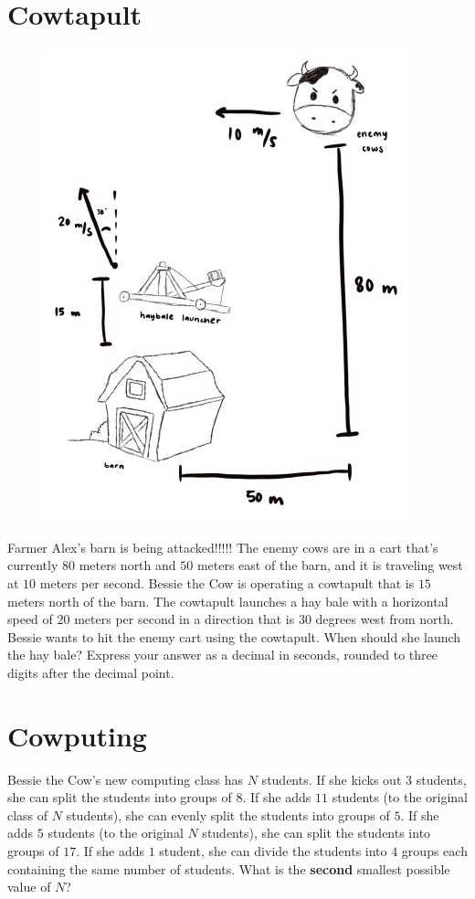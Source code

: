\documentclass{article}
\begin{document}
\section*{Cowtapult}
\begin{figure}
    \vspace{-20pt}
    \centering
    \includegraphics[scale=0.25]{cowtapult.png}
    \vspace{-20pt}
\end{figure}
Farmer Alex's barn is being attacked!!!!!
The enemy cows are in a cart that's currently $80$ meters north and $50$ meters east of the barn, and it is traveling west at $10$ meters per second.
Bessie the Cow is operating a cowtapult that is $15$ meters north of the barn.
The cowtapult launches a hay bale with a horizontal speed of $20$ meters per second in a direction that is $30$ degrees west from north.
Bessie wants to hit the enemy cart using the cowtapult.
When should she launch the hay bale?
Express your answer as a decimal in seconds, rounded to three digits after the decimal point.

\section*{Cowputing}
Bessie the Cow's new computing class has $N$ students.
If she kicks out $3$ students, she can split the students into groups of $8$.
If she adds $11$ students (to the original class of $N$ students), she can evenly split the students into groups of $5$.
If she adds $5$ students (to the original $N$ students), she can split the students into groups of $17$.
If she adds $1$ student, she can divide the students into $4$ groups each containing the same number of students.
What is the \textbf{second} smallest possible value of $N$?
\end{document}
